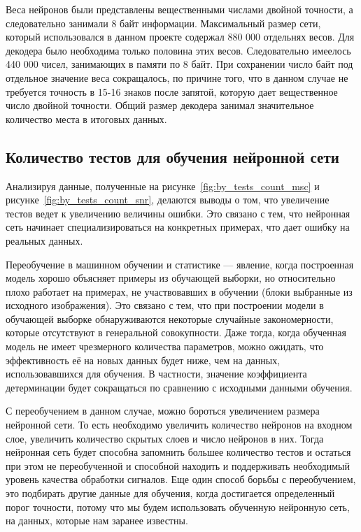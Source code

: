 Веса нейронов были представлены вещественными числами двойной точности, а следовательно занимали 8 байт информации.
Максимальный размер сети, который использовался в данном проекте содержал 880 000 отдельнях весов. Для декодера было необходима только половина этих весов.
Следовательно имеелось 440 000 чисел, занимающих в памяти по 8 байт. При сохранении число байт под отдельное значение веса сокращалось, по причине того, что в данном
случае не требуется точность в 15-16 знаков после запятой, которую дает вещественное число двойной точности. Общий размер декодера занимал значительное количество места в итоговых данных.

\subsection{Количество тестов для обучения нейронной сети}
\label{sub:analysis:tests}

Анализируя данные, полученные на рисунке~\ref{fig:by_tests_count_msc} и рисунке~\ref{fig:by_tests_count_snr},
делаются выводы о том, что увеличение тестов ведет к увеличению величины ошибки.
Это связано с тем, что нейронная сеть начинает специализироваться на конкретных примерах, что дает ошибку на реальных данных.

Переобучение в машинном обучении и статистике --- явление, когда построенная модель хорошо объясняет примеры из обучающей выборки,
но относительно плохо работает на примерах, не участвовавших в обучении (блоки выбранные из исходного изображения).
Это связано с тем, что при построении модели в обучающей выборке обнаруживаются некоторые случайные закономерности,
которые отсутствуют в генеральной совокупности.
Даже тогда, когда обученная модель не имеет чрезмерного количества параметров, можно ожидать, что эффективность её на новых данных будет ниже,
чем на данных, использовавшихся для обучения. В частности, значение коэффициента детерминации будет сокращаться по сравнению с исходными данными обучения.

С переобучением в данном случае, можно бороться увеличением размера нейронной сети. То есть необходимо увеличить количество нейронов на входном слое,
увеличить количество скрытых слоев и число нейронов в них. Тогда нейронная сеть будет способна запомнить большее количество тестов и остаться при этом
не переобученной и способной находить и поддерживать необходимый уровень качества обработки сигналов. Еще один способ борьбы с переобучением,
это подбирать другие данные для обучения, когда достигается определенный порог точности, потому что мы будем использовать обученную нейронную сеть, на данных,
которые нам заранее известны.

